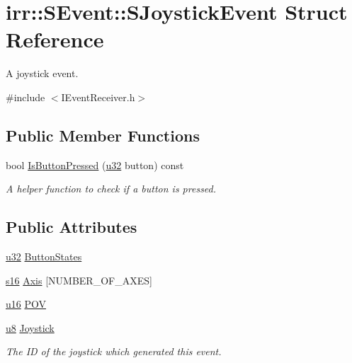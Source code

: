 \hypertarget{structirr_1_1SEvent_1_1SJoystickEvent}{}\section{irr\+:\+:S\+Event\+:\+:S\+Joystick\+Event Struct Reference}
\label{structirr_1_1SEvent_1_1SJoystickEvent}


A joystick event.  




{\ttfamily \#include $<$I\+Event\+Receiver.\+h$>$}

\subsection*{Public Member Functions}
\begin{DoxyCompactItemize}
\item 
\mbox{\label{structirr_1_1SEvent_1_1SJoystickEvent_a618eae5c6218fc9d3b93e68038ca97f2}} 
bool \hyperlink{structirr_1_1SEvent_1_1SJoystickEvent_a618eae5c6218fc9d3b93e68038ca97f2}{Is\+Button\+Pressed} (\hyperlink{namespaceirr_a0416a53257075833e7002efd0a18e804}{u32} button) const
\begin{DoxyCompactList}\small\item\em A helper function to check if a button is pressed. \end{DoxyCompactList}\end{DoxyCompactItemize}
\subsection*{Public Attributes}
\begin{DoxyCompactItemize}
\item 
\hyperlink{namespaceirr_a0416a53257075833e7002efd0a18e804}{u32} \hyperlink{structirr_1_1SEvent_1_1SJoystickEvent_a4fd74c22d62c1613405dc3191ccc5b7c}{Button\+States}
\item 
\hyperlink{namespaceirr_a43ace0af066371ac0862bac3f7314220}{s16} \hyperlink{structirr_1_1SEvent_1_1SJoystickEvent_a1ad2615ffdd8de01b93414228ac3a2d9}{Axis} \mbox{[}N\+U\+M\+B\+E\+R\+\_\+\+O\+F\+\_\+\+A\+X\+ES\mbox{]}
\item 
\hyperlink{namespaceirr_ae9f8ec82692ad3b83c21f555bfa70bcc}{u16} \hyperlink{structirr_1_1SEvent_1_1SJoystickEvent_af30285332d154507b9752ffde3f6bf84}{P\+OV}
\item 
\hyperlink{namespaceirr_a646874f69af8ff87fc10201b0254a761}{u8} \hyperlink{structirr_1_1SEvent_1_1SJoystickEvent_a04424b44a1c3370263afb3af501cae44}{Joystick}
\begin{DoxyCompactList}\small\item\em The ID of the joystick which generated this event. \end{DoxyCompactList}\end{DoxyCompactItemize}


